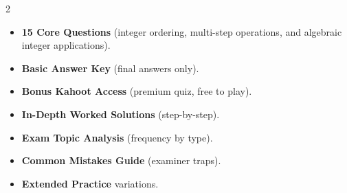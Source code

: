 \documentclass[11pt,a4paper]{article}
\newcommand{\FullReleaseDate}{April 30, 2026}
\begin{document}
\vspace{8pt}

\begin{multicols}{2}
  \begin{tcolorbox}[card, title=\sffamily\bfseries\textcolor{white}{\faHandPointDown\ TODAY (Simplified Version)}, colbacktitle=mainblue, boxed title style={sharp corners, boxrule=0pt}]
    \begin{itemize}[leftmargin=1.2em, itemsep=2pt]
      \item \small \textbf{15 Core Questions} (integer ordering, multi-step operations, and algebraic integer applications).
      \item \small \textbf{Basic Answer Key} (final answers only).
      \item \small \textbf{Bonus Kahoot Access} (premium quiz, free to play).
    \end{itemize}
  \end{tcolorbox}

  \columnbreak

  \begin{tcolorbox}[card, title=\sffamily\bfseries\textcolor{white}{\faRocket\ ON \FullReleaseDate\ (Full Upgrade)}, colbacktitle=mainblue, boxed title style={sharp corners, boxrule=0pt}]
    \begin{itemize}[leftmargin=1.2em, itemsep=2pt]
      \item \small \textbf{In-Depth Worked Solutions} (step-by-step).
      \item \small \textbf{Exam Topic Analysis} (frequency by type).
      \item \small \textbf{Common Mistakes Guide} (examiner traps).
      \item \small \textbf{Extended Practice} variations.
    \end{itemize}
  \end{tcolorbox}
\end{multicols}
\end{document}

